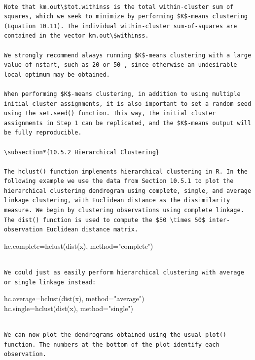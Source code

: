 \documentclass[10pt]{article}
\begin{document}
\begin{verbatim}

Note that km.out\$tot.withinss is the total within-cluster sum of squares, which we seek to minimize by performing $K$-means clustering (Equation 10.11). The individual within-cluster sum-of-squares are contained in the vector km.out\$withinss.

We strongly recommend always running $K$-means clustering with a large value of nstart, such as 20 or 50 , since otherwise an undesirable local optimum may be obtained.

When performing $K$-means clustering, in addition to using multiple initial cluster assignments, it is also important to set a random seed using the set.seed() function. This way, the initial cluster assignments in Step 1 can be replicated, and the $K$-means output will be fully reproducible.

\subsection*{10.5.2 Hierarchical Clustering}

The hclust() function implements hierarchical clustering in R. In the following example we use the data from Section 10.5.1 to plot the hierarchical clustering dendrogram using complete, single, and average linkage clustering, with Euclidean distance as the dissimilarity measure. We begin by clustering observations using complete linkage. The dist() function is used to compute the $50 \times 50$ inter-observation Euclidean distance matrix.
\end{verbatim}

\begin{displayquote}
hc.complete=hclust(dist(x), method="complete")
\end{displayquote}

\begin{verbatim}

We could just as easily perform hierarchical clustering with average or single linkage instead:
\end{verbatim}

\begin{displayquote}
hc.average=hclust(dist(x), method="average")\\
hc.single=hclust(dist(x), method="single")
\end{displayquote}

\begin{verbatim}

We can now plot the dendrograms obtained using the usual plot() function. The numbers at the bottom of the plot identify each observation.
\end{verbatim}
\end{document}
